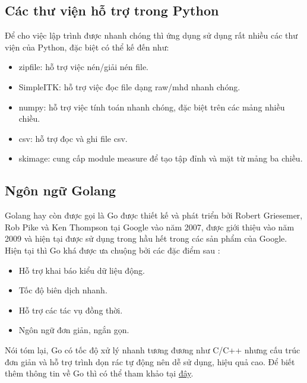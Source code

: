 \subsection{Các thư viện hỗ trợ trong Python}
Để cho việc lập trình được nhanh chóng thì ứng dụng sử dụng rất nhiều các thư viện của Python, đặc biệt có thể kế đến như:
\begin{itemize}
    \item zipfile: hỗ trợ việc nén/giải nén file.
    \item SimpleITK: hỗ trợ việc đọc file dạng raw/mhd nhanh chóng.
    \item numpy: hỗ trợ việc tính toán nhanh chóng, đặc biệt trên các mảng nhiều chiều.
    \item csv: hỗ trợ đọc và ghi file csv.
    \item skimage: cung cấp module measure để tạo tập đỉnh và mặt từ mảng ba chiều.
\end{itemize}
\subsection{Ngôn ngữ Golang}
Golang hay còn được gọi là Go được thiết kế và phát triển bởi Robert Griesemer, Rob Pike và Ken Thompson tại Google vào năm 2007, được giới thiệu vào năm 2009 và hiện tại được sử dụng trong hầu hết trong các sản phẩm của Google. Hiện tại thì Go khá được ưa chuộng bởi các đặc điểm sau \cite{website:golang}:
\begin{itemize}
    \item Hỗ trợ khai báo kiểu dữ liệu động.
    \item Tốc độ biên dịch nhanh.
    \item Hỗ trợ các tác vụ đồng thời.
    \item Ngôn ngữ đơn giản, ngắn gọn.
\end{itemize}
Nói tóm lại, Go có tốc độ xử lý nhanh tương đương như C/C++ nhưng cấu trúc đơn giản và hỗ trợ trình dọn rác tự động nên dễ sử dụng, hiệu quả cao. Để biết thêm thông tin về Go thì có thể tham khảo tại \href{https://golang.org/doc/}{đây}. 
